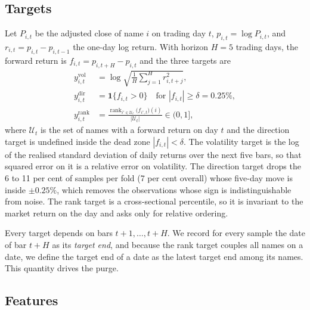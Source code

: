 \documentclass[10pt,a4paper,twoside,twocolumn]{article}
\DeclareMathOperator{\rank}{rank}
\begin{document}
\subsection{Targets}

Let $P_{i,t}$ be the adjusted close of name $i$ on trading day $t$, $p_{i,t}=\log P_{i,t}$, and $r_{i,t}=p_{i,t}-p_{i,t-1}$ the one-day log return. With horizon $H=5$ trading days, the forward return is $f_{i,t}=p_{i,t+H}-p_{i,t}$ and the three targets are
\begin{align}
y^{\text{vol}}_{i,t} &= \log\sqrt{\tfrac{1}{H}\textstyle\sum_{j=1}^{H} r_{i,t+j}^{2}}, \label{eq:vol}\\
y^{\text{dir}}_{i,t} &= \mathbf{1}\{f_{i,t}>0\}\quad\text{for } |f_{i,t}|\ge\delta=0.25\%, \label{eq:dir}\\
y^{\text{rank}}_{i,t} &= \frac{\rank_{i'\in\mathcal{U}_t}\!\big(f_{i',t}\big)(i)}{|\mathcal{U}_t|}\in(0,1], \label{eq:rank}
\end{align}
where $\mathcal{U}_t$ is the set of names with a forward return on day $t$ and the direction target is undefined inside the dead zone $|f_{i,t}|<\delta$. The volatility target is the log of the realised standard deviation of daily returns over the next five bars, so that squared error on it is a relative error on volatility. The direction target drops the 6 to 11 per cent of samples per fold (7 per cent overall) whose five-day move is inside $\pm 0.25\%$, which removes the observations whose sign is indistinguishable from noise. The rank target is a cross-sectional percentile, so it is invariant to the market return on the day and asks only for relative ordering.

Every target depends on bars $t+1,\dots,t+H$. We record for every sample the date of bar $t+H$ as its \emph{target end}, and because the rank target couples all names on a date, we define the target end of a date as the latest target end among its names. This quantity drives the purge.

\subsection{Features}\label{sec:features}
\end{document}
